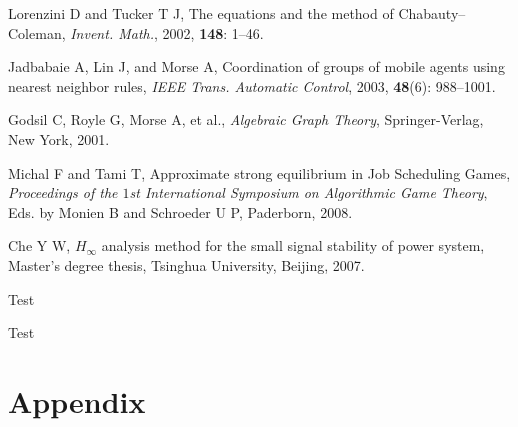 \documentclass{jssc}
\begin{document}
\begin{thebibliography}{199}

Lorenzini D and Tucker T J, The equations and the method of
Chabauty--Coleman, {\it Invent. Math.}, 2002, {\bf 148}: 1--46.

Jadbabaie A, Lin J, and  Morse A, Coordination of groups of mobile
agents using nearest neighbor rules, {\it IEEE Trans. Automatic
Control}, 2003, {\bf 48}(6): 988--1001.

Godsil C, Royle G, Morse A, et al., {\it Algebraic Graph Theory},
Springer-Verlag, New York, 2001.

Michal F and Tami T, Approximate strong equilibrium in Job
Scheduling Games, {\it Proceedings of the $1$st International
Symposium on Algorithmic Game Theory}, Eds. by  Monien B and
Schroeder U P, Paderborn, 2008.

Che Y W, $H_\infty$ analysis method for the small signal stability
of power system, Master's degree thesis, Tsinghua University,
Beijing, 2007.

Test

Test

\end{thebibliography}

\section*{Appendix}

\setcounter{equation}{0}
\renewcommand\theequation{A.\arabic{equation}}
\end{document}
